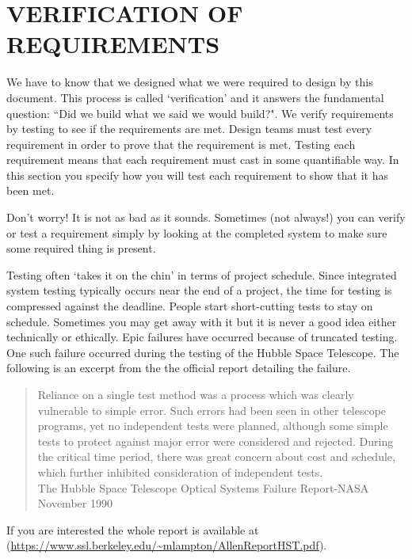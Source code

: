 \section{VERIFICATION OF REQUIREMENTS}




\begin{slshape}
\color{blue}

We have to know that we designed what we were required to design by this document.  This process is called `verification' and it answers the fundamental question: ``Did we build what we said we would build?".  We verify requirements by testing to see if the requirements are met.  Design teams must test every requirement in order to prove that the requirement is met.  Testing each requirement means that each requirement must cast in some quantifiable way.  In this section you specify how you will test each requirement to show that it has been met.
\bigskip

Don't worry!  It is not as bad as it sounds.  Sometimes (not always!) you can verify or test a requirement simply by looking at the completed system to make sure some required thing is present. 
\bigskip

Testing often `takes it on the chin' in terms of project schedule.  Since integrated system testing typically occurs near the end of a project, the time for testing is compressed against the deadline.  People start short-cutting tests to stay on schedule.  Sometimes you may get away with it but it is never a good idea either technically or ethically.  Epic failures have occurred because of truncated testing.  One such failure occurred during the testing of the Hubble Space Telescope.  The following is an excerpt from the the official report detailing the failure.

\begin{quote}
Reliance on a single test method was a process which was clearly
vulnerable to simple error. Such errors had been seen in other telescope
programs, yet no independent tests were planned, although some simple tests to
protect against major error were considered and rejected. During the critical time
period, there was great concern about cost and schedule, which further inhibited
consideration of independent tests.\\
\bigskip
The Hubble Space Telescope Optical Systems Failure Report-NASA November 1990 
\end{quote}
\bigskip

If you are interested the whole report is available at (\url{https://www.ssl.berkeley.edu/~mlampton/AllenReportHST.pdf}).
\bigskip


\end{slshape}
